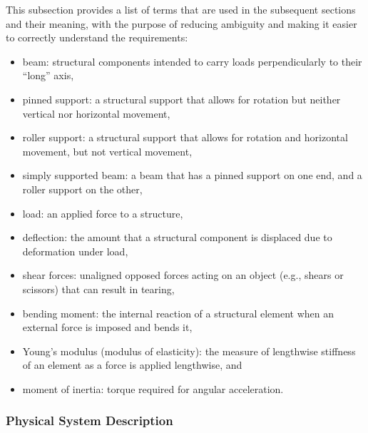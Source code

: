 \documentclass[12pt]{article}
\begin{document}
This subsection provides a list of terms that are used in the subsequent
sections and their meaning, with the purpose of reducing ambiguity and making it
easier to correctly understand the requirements:

\begin{itemize}

    \item beam: structural components intended to carry loads perpendicularly to
          their ``long'' axis\nc{},

    \item pinned support: a structural support that allows for rotation but
          neither vertical nor horizontal movement\nc{},

    \item roller support: a structural support that allows for rotation and
          horizontal movement, but not vertical movement\nc{},

    \item simply supported beam: a beam that has a pinned support on one end,
          and a roller support on the other\nc{},

    \item load: an applied force to a structure\nc{},

    \item deflection: the amount that a structural component is displaced due to
          deformation under load\nc{},

    \item shear forces: unaligned opposed forces acting on an object (e.g.,
          shears or scissors) that can result in tearing\nc{},

    \item bending moment: the internal reaction of a structural element when an
          external force is imposed and bends it\nc{},

    \item Young's modulus (modulus of elasticity): the measure of lengthwise
          stiffness of an element as a force is applied lengthwise\nc{}, and

    \item moment of inertia: torque required for angular acceleration\nc{}.

\end{itemize}

\subsubsection{Physical System Description}
\label{sec_phySystDescrip}
\end{document}
